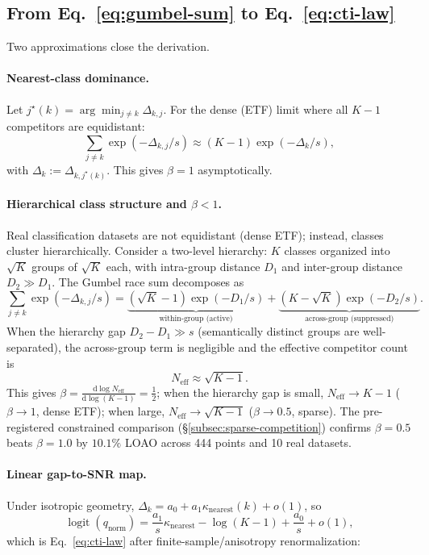 \documentclass{article}
\DeclareMathOperator{\logit}{logit}
\begin{document}
\subsection{From Eq.~\ref{eq:gumbel-sum} to Eq.~\ref{eq:cti-law}}
Two approximations close the derivation.

\paragraph{Nearest-class dominance.}
Let $j^\star(k)=\arg\min_{j\neq k}\Delta_{k,j}$. For the dense (ETF) limit where all $K-1$ competitors are equidistant:
\[
\sum_{j\neq k}\exp(-\Delta_{k,j}/s)\approx (K-1)\exp(-\Delta_k/s),
\]
with $\Delta_k:=\Delta_{k,j^\star(k)}$. This gives $\beta=1$ asymptotically.

\paragraph{Hierarchical class structure and $\beta < 1$.}
Real classification datasets are not equidistant (dense ETF); instead, classes cluster hierarchically.
Consider a two-level hierarchy: $K$ classes organized into $\sqrt{K}$ groups of $\sqrt{K}$ each,
with intra-group distance $D_1$ and inter-group distance $D_2\gg D_1$.
The Gumbel race sum decomposes as
\begin{equation}
\label{eq:hierarchical-decomp}
\sum_{j\neq k}\exp(-\Delta_{k,j}/s)
= \underbrace{(\sqrt{K}-1)\exp(-D_1/s)}_{\text{within-group (active)}}
+ \underbrace{(K-\sqrt{K})\exp(-D_2/s)}_{\text{across-group (suppressed)}}.
\end{equation}
When the hierarchy gap $D_2-D_1\gg s$ (semantically distinct groups are well-separated),
the across-group term is negligible and the effective competitor count is
\[
N_\mathrm{eff}\approx \sqrt{K-1}.
\]
This gives $\beta=\frac{\mathrm{d}\log N_\mathrm{eff}}{\mathrm{d}\log(K-1)}=\frac{1}{2}$; when the hierarchy gap is small, $N_\mathrm{eff}\to K-1$ ($\beta\to 1$, dense ETF); when large, $N_\mathrm{eff}\to\sqrt{K-1}$ ($\beta\to 0.5$, sparse).
The pre-registered constrained comparison (\S\ref{subsec:sparse-competition}) confirms
$\beta=0.5$ beats $\beta=1.0$ by $10.1\%$ LOAO across 444 points and 10 real datasets.

\paragraph{Linear gap-to-SNR map.}
Under isotropic geometry, $\Delta_k = a_0+a_1\kappa_{\mathrm{nearest}}(k)+o(1)$, so
\[
\logit(q_{\mathrm{norm}})=
\frac{a_1}{s}\kappa_{\mathrm{nearest}} - \log(K-1) + \frac{a_0}{s} + o(1),
\]
which is Eq.~\ref{eq:cti-law} after finite-sample/anisotropy renormalization:
\end{document}
